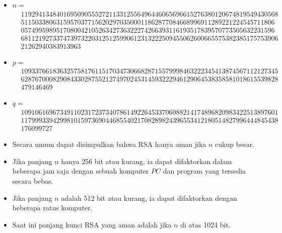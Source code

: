 \documentclass{article}
\begin{document}
\begin{itemize}
    \item $n = $\
    \begin{align*}
    &1192941348401695090555272113312556496446065696615276380120674819549430568 \\
    &511503380631595703771562029703500011862877084668996911289221224545711806 \\
    &057499598951708004210526342736322274266393116193517839570773505632231596 \\
    &6811219273374739732203125125990612313222509455062600665575382385175753906 \\
    &21262940383913963
    \end{align*}

    \item $p = $\
    \begin{align*}
    &1093376618363257581761151703473066828715579998463222345413874567112127345 \\
    &6287670008290843302875521274970245314593222946129064538358581018615539828 \\
    &479146469
    \end{align*}

    \item $q = $\
    \begin{align*}
    &1091061696734911023172373407861492264533706088214174896820983422513897601 \\
    &1179993394299810159736904468554021708289824396553412180514827996444845438 \\
    &176099727
    \end{align*}
\end{itemize}

\newpage


\begin{itemize}
    \item Secara umum dapat disimpulkan bahwa RSA hanya aman jika $n$ cukup besar.
    \item Jika panjang $n$ hanya 256 bit atau kurang, ia dapat difaktorkan dalam beberapa jam saja dengan sebuah komputer $PC$ dan program yang tersedia secara bebas.
    \item Jika panjang $n$ adalah 512 bit atau kurang, ia dapat difaktorkan dengan beberapa ratus komputer.
    \item Saat ini panjang kunci RSA yang aman adalah jika $n$ di atas 1024 bit.
\end{itemize}
\end{document}
